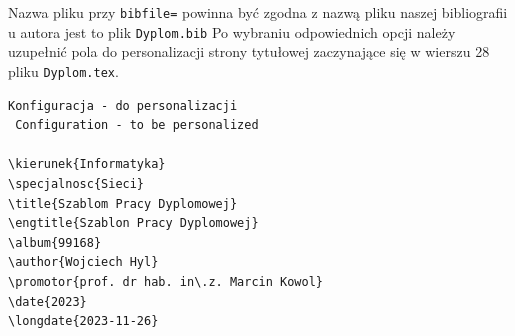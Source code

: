 Nazwa pliku przy \texttt{bibfile=} powinna być zgodna z nazwą pliku naszej bibliografii u autora jest to plik \texttt{Dyplom.bib}
Po wybraniu odpowiednich opcji należy uzupełnić pola do personalizacji strony tytułowej zaczynające się w wierszu 28 pliku \texttt{Dyplom.tex}.
\begin{lstlisting}[caption={Ustawienia dotyczące strony tytułowej}, label=lst:Ustawienia dotyczące strony tytułowej ,firstnumber=28]
 Konfiguracja - do personalizacji
 Configuration - to be personalized

\kierunek{Informatyka}
\specjalnosc{Sieci}
\title{Szablom Pracy Dyplomowej}
\engtitle{Szablon Pracy Dyplomowej}
\album{99168}
\author{Wojciech Hyl}
\promotor{prof. dr hab. in\.z. Marcin Kowol}
\date{2023}
\longdate{2023-11-26}


\end{lstlisting}
\clearpage

